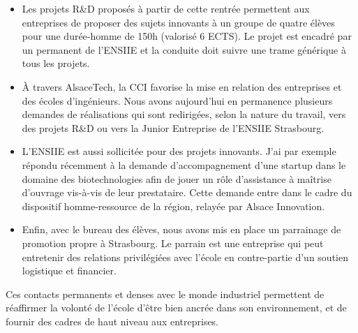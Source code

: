 \documentclass[11pt]{article}
\begin{document}
\begin{itemize}
\item  Les projets  R\&D  proposés  à partir  de  cette  rentrée permettent  aux
  entreprises de proposer des sujets innovants à un groupe de quatre élèves pour
  une  durée-homme de  150h (valorisé  6 ECTS).   Le projet  est encadré  par un
  permanent de  l'ENSIIE et la conduite  doit suivre une trame  générique à tous
  les projets.

\item  \`A  travers  AlsaceTech,  la  CCI  favorise  la  mise  en  relation  des
  entreprises et des écoles d'ingénieurs.   Nous avons aujourd'hui en permanence
  plusieurs demandes  de réalisations  qui sont redirigées,  selon la  nature du
  travail,  vers des  projets  R\&D  ou vers  la  Junior  Entreprise de  l'ENSIIE
  Strasbourg.

\item L'ENSIIE est aussi sollicitée pour des projets innovants. J'ai par exemple
  répondu récemment à la demande  d'accompagnement d'une startup dans le domaine
  des biotechnologies  afin de jouer  un rôle d'assistance à  maîtrise d'ouvrage
  vis-à-vis de leur prestataire. Cette demande entre dans le cadre du dispositif
  homme-ressource de la région, relayée par Alsace Innovation.

\item Enfin, avec le bureau des élèves, nous avons mis en place un parrainage de
  promotion  propre  à Strasbourg.   Le  parrain  est  une entreprise  qui  peut
  entretenir  des  relations privilégiées  avec  l'école  en contre-partie  d'un
  soutien logistique et financier. 
  

\end{itemize}

\medskip
Ces  contacts  permanents et  denses  avec  le  monde industriel  permettent  de
réaffirmer la volonté de l'école d'être bien ancrée dans son environnement, et de
fournir des cadres de haut niveau aux entreprises.
\end{document}
